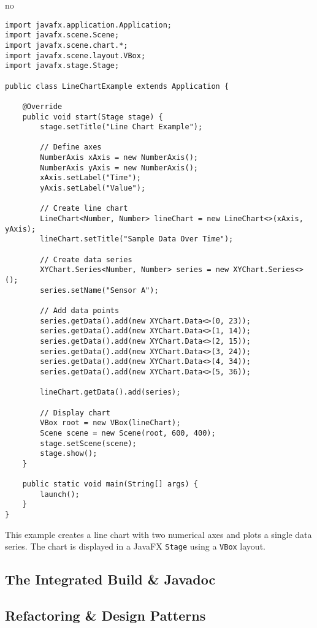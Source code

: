 no\documentclass{article}
\newcommand{\codecmd}[1]{\textcolor[rgb]{0,0.5,0}{\texttt{#1}}}
\begin{document}
\begin{verbatim}
import javafx.application.Application;
import javafx.scene.Scene;
import javafx.scene.chart.*;
import javafx.scene.layout.VBox;
import javafx.stage.Stage;

public class LineChartExample extends Application {

    @Override
    public void start(Stage stage) {
        stage.setTitle("Line Chart Example");

        // Define axes
        NumberAxis xAxis = new NumberAxis();
        NumberAxis yAxis = new NumberAxis();
        xAxis.setLabel("Time");
        yAxis.setLabel("Value");

        // Create line chart
        LineChart<Number, Number> lineChart = new LineChart<>(xAxis, yAxis);
        lineChart.setTitle("Sample Data Over Time");

        // Create data series
        XYChart.Series<Number, Number> series = new XYChart.Series<>();
        series.setName("Sensor A");

        // Add data points
        series.getData().add(new XYChart.Data<>(0, 23));
        series.getData().add(new XYChart.Data<>(1, 14));
        series.getData().add(new XYChart.Data<>(2, 15));
        series.getData().add(new XYChart.Data<>(3, 24));
        series.getData().add(new XYChart.Data<>(4, 34));
        series.getData().add(new XYChart.Data<>(5, 36));

        lineChart.getData().add(series);

        // Display chart
        VBox root = new VBox(lineChart);
        Scene scene = new Scene(root, 600, 400);
        stage.setScene(scene);
        stage.show();
    }

    public static void main(String[] args) {
        launch();
    }
}
\end{verbatim}

This example creates a line chart with two numerical axes and plots a single data series. The chart is displayed in a JavaFX \codecmd{Stage} using a \codecmd{VBox} layout.






\subsection{The Integrated Build \& Javadoc}

\subsection{Refactoring \& Design Patterns}
\end{document}
